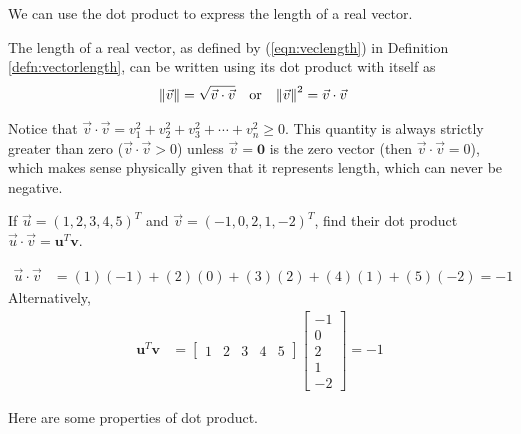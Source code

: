 We can use the dot product to express the length of a real vector.
\begin{proper}
\label{proper:lengthdot}
The length of a real vector, as defined by (\ref{eqn:veclength}) in Definition \ref{defn:vectorlength}, can be written using its dot product with itself as
\begin{align}
\norm{\vec{v}} &= \sqrt{\vec{v} \cdot \vec{v}} & &\text{or} &
\norm{\vec{v}}^2 &= \vec{v} \cdot \vec{v}
\end{align}
\end{proper}
Notice that $\vec{v} \cdot \vec{v} = v_1^2 + v_2^2 + v_3^2 + \cdots + v_n^2 \geq 0$. This quantity is always strictly greater than zero ($\vec{v} \cdot \vec{v} > 0$) unless $\vec{v} = \textbf{0}$ is the zero vector (then $\vec{v} \cdot \vec{v} = 0$), which makes sense physically given that it represents length, which can never be negative.
\begin{exmp}
\label{exmp:dotproduct5d}
If $\vec{u} = (1, 2, 3, 4, 5)^T$ and $\vec{v} = (-1, 0, 2, 1, -2)^T$, find their dot product $\vec{u} \cdot \vec{v} = \textbf{u}^T\textbf{v}$.
\end{exmp}
\begin{solution}
\begin{align*}
\vec{u} \cdot \vec{v} &= (1)(-1) + (2)(0) + (3)(2) + (4)(1) + (5)(-2) = -1
\end{align*}
Alternatively,
\begin{align*}
\textbf{u}^T\textbf{v} &=
\begin{bmatrix}
1 & 2 & 3 & 4 & 5
\end{bmatrix}
\begin{bmatrix}
-1 \\
0 \\
2 \\
1 \\
-2
\end{bmatrix}
= -1
\end{align*}
\end{solution}
Here are some properties of dot product.
